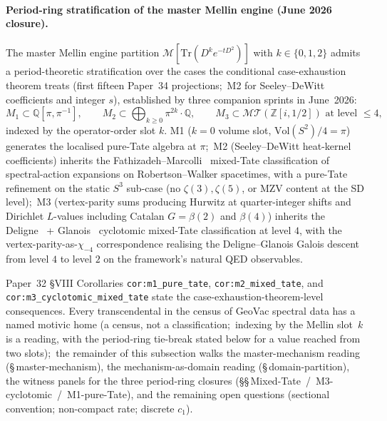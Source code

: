 \documentclass[aps,pra,twocolumn,superscriptaddress,longbibliography]{revtex4-2}
\begin{document}
\paragraph{Period-ring stratification of the master Mellin engine
(June 2026 closure).}
The master Mellin engine partition $\mathcal{M}[\mathrm{Tr}(D^k e^{-tD^2})]$
with $k \in \{0, 1, 2\}$ admits a period-theoretic stratification over
the cases the conditional case-exhaustion theorem treats (first fifteen
Paper~34 projections;\ M2 for Seeley--DeWitt coefficients and integer
$s$), established by three companion sprints in June~2026:
\begin{equation}
\label{eq:m_engine_period_stratification}
M_1 \subset \mathbb{Q}[\pi, \pi^{-1}], \qquad
M_2 \subset \bigoplus_{k \ge 0} \pi^{2k}\cdot\mathbb{Q}, \qquad
M_3 \subset \mathcal{MT}(\mathbb{Z}[i, 1/2]) \text{ at level } \le 4,
\end{equation}
indexed by the operator-order slot $k$.  M1 ($k = 0$ volume slot,
$\mathrm{Vol}(S^2)/4 = \pi$) generates the localised pure-Tate algebra
at $\pi$;\ M2 (Seeley--DeWitt heat-kernel coefficients) inherits the
Fathizadeh--Marcolli~\cite{fathizadeh_marcolli2016} mixed-Tate
classification of spectral-action expansions on Robertson--Walker
spacetimes, with a pure-Tate refinement on the static $S^3$ sub-case
(no $\zeta(3), \zeta(5)$, or MZV content at the SD level);\ M3
(vertex-parity sums producing Hurwitz at quarter-integer shifts and
Dirichlet $L$-values including Catalan $G = \beta(2)$ and $\beta(4)$)
inherits the Deligne~\cite{deligne2010} + Glanois~\cite{glanois2015}
cyclotomic mixed-Tate classification at level $4$, with the
vertex-parity-as-$\chi_{-4}$ correspondence realising the
Deligne--Glanois Galois descent from level $4$ to level $2$ on the
framework's natural QED observables.

Paper~32 §VIII Corollaries \texttt{cor:m1\_pure\_tate},
\texttt{cor:m2\_mixed\_tate}, and \texttt{cor:m3\_cyclotomic\_mixed\_tate}
state the case-exhaustion-theorem-level consequences.  Every
transcendental in the census of GeoVac spectral data has a named motivic
home (a census, not a classification;\ indexing by the Mellin slot~$k$ is
a reading, with the period-ring tie-break stated below for a value
reached from two slots);\ the remainder of this
subsection walks the master-mechanism reading
(\S\,master-mechanism), the mechanism-as-domain reading
(\S\,domain-partition), the witness panels for the three period-ring
closures (\S\S\,Mixed-Tate~/~M3-cyclotomic~/~M1-pure-Tate), and the
remaining open questions (sectional convention; non-compact rate;
discrete $c_1$).
\end{document}
